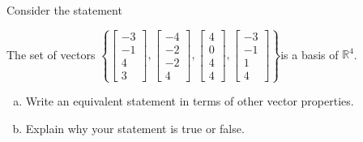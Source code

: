 
\begin{exerciseStatement}


Consider the statement 
\begin{center}\begin{minipage}{0.8\textwidth}
 The set of vectors \( \left\{ \left[\begin{array}{c}
-3 \\
-1 \\
4 \\
3
\end{array}\right] , \left[\begin{array}{c}
-4 \\
-2 \\
-2 \\
4
\end{array}\right] , \left[\begin{array}{c}
4 \\
0 \\
4 \\
4
\end{array}\right] , \left[\begin{array}{c}
-3 \\
-1 \\
1 \\
4
\end{array}\right] \right\} \)is a basis of \(\mathbb{R}^4\). 
\end{minipage}\end{center}
    


\begin{enumerate}[(a)]
\item  Write an equivalent statement in terms of other vector properties.
\item  Explain why your statement is true or false.
\end{enumerate}
    
\end{exerciseStatement}
    
